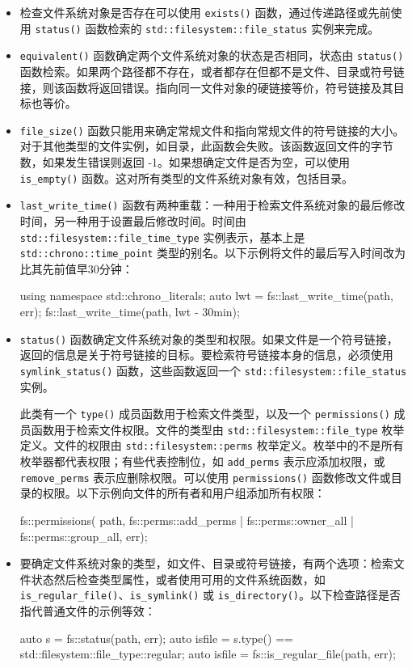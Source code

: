 \begin{itemize}
\item
检查文件系统对象是否存在可以使用 \verb|exists()| 函数，通过传递路径或先前使用 \verb|status()| 函数检索的 \verb|std::filesystem::file_status| 实例来完成。

\item
\verb|equivalent()| 函数确定两个文件系统对象的状态是否相同，状态由 \verb|status()| 函数检索。如果两个路径都不存在，或者都存在但都不是文件、目录或符号链接，则该函数将返回错误。指向同一文件对象的硬链接等价，符号链接及其目标也等价。

\item
\verb|file_size()| 函数只能用来确定常规文件和指向常规文件的符号链接的大小。对于其他类型的文件实例，如目录，此函数会失败。该函数返回文件的字节数，如果发生错误则返回 -1。如果想确定文件是否为空，可以使用 \verb|is_empty()| 函数。这对所有类型的文件系统对象有效，包括目录。

\item
\verb|last_write_time()| 函数有两种重载：一种用于检索文件系统对象的最后修改时间，另一种用于设置最后修改时间。时间由 \verb|std::filesystem::file_time_type| 实例表示，基本上是 \verb|std::chrono::time_point| 类型的别名。以下示例将文件的最后写入时间改为比其先前值早30分钟：

\begin{cpp}
using namespace std::chrono_literals;
auto lwt = fs::last_write_time(path, err);
fs::last_write_time(path, lwt - 30min);
\end{cpp}

\item
\verb|status()| 函数确定文件系统对象的类型和权限。如果文件是一个符号链接，返回的信息是关于符号链接的目标。要检索符号链接本身的信息，必须使用 \verb|symlink_status()| 函数，这些函数返回一个 \verb|std::filesystem::file_status| 实例。

此类有一个 \verb|type()| 成员函数用于检索文件类型，以及一个 \verb|permissions()| 成员函数用于检索文件权限。文件的类型由 \verb|std::filesystem::file_type| 枚举定义。文件的权限由 \verb|std::filesystem::perms| 枚举定义。枚举中的不是所有枚举器都代表权限；有些代表控制位，如 \verb|add_perms| 表示应添加权限，或 \verb|remove_perms| 表示应删除权限。可以使用 \verb|permissions()| 函数修改文件或目录的权限。以下示例向文件的所有者和用户组添加所有权限：

\begin{cpp}
fs::permissions(
    path,
    fs::perms::add_perms |
    fs::perms::owner_all | fs::perms::group_all,
    err);
\end{cpp}

\item
要确定文件系统对象的类型，如文件、目录或符号链接，有两个选项：检索文件状态然后检查类型属性，或者使用可用的文件系统函数，如 \verb|is_regular_file()|、\verb|is_symlink()| 或 \verb|is_directory()|。以下检查路径是否指代普通文件的示例等效：

\begin{cpp}
auto s = fs::status(path, err);
auto isfile = s.type() == std::filesystem::file_type::regular;
auto isfile = fs::is_regular_file(path, err);
\end{cpp}
\end{itemize}

